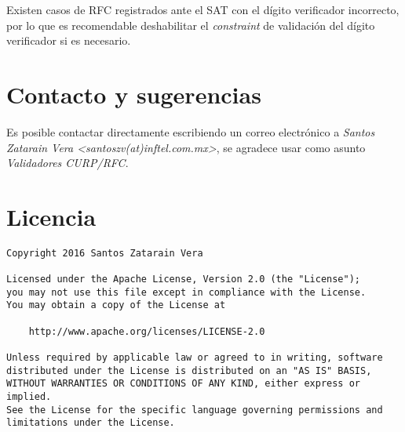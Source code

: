 \documentclass[12pt,letterpaper]{article}
\begin{document}
Existen casos de RFC registrados ante el SAT con el dígito verificador incorrecto, por lo que
es recomendable deshabilitar el \emph{constraint} de validación del dígito verificador si es necesario.

\section{Contacto y sugerencias}

Es posible contactar directamente escribiendo un correo electrónico a
\emph{Santos Zatarain Vera <santoszv(at)inftel.com.mx>}, se agradece usar
como asunto \emph{Validadores CURP/RFC}.

\section{Licencia}

\begin{verbatim}
Copyright 2016 Santos Zatarain Vera

Licensed under the Apache License, Version 2.0 (the "License");
you may not use this file except in compliance with the License.
You may obtain a copy of the License at

    http://www.apache.org/licenses/LICENSE-2.0

Unless required by applicable law or agreed to in writing, software
distributed under the License is distributed on an "AS IS" BASIS,
WITHOUT WARRANTIES OR CONDITIONS OF ANY KIND, either express or implied.
See the License for the specific language governing permissions and
limitations under the License.
\end{verbatim}
\end{document}
